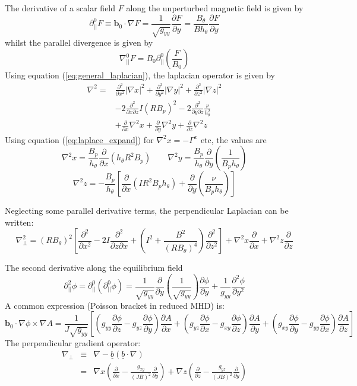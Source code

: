 \documentclass[12pt]{article}
\newcommand{\deriv}[2]{\ensuremath{\frac{\partial #1}{\partial #2}}}
\newcommand{\dderiv}[2]{\ensuremath{\frac{\partial^2 #1}{\partial {#2}^2}}}
\newcommand{\hthe}{\ensuremath{h_\theta}}
\newcommand{\Bp}{\ensuremath{B_\theta}}
\newcommand{\Vec}[1]{\ensuremath{\mathbf{#1}}}
\newcommand{\delp}{\nabla_\perp^2}
\newcommand{\rbp}{\ensuremath{R\Bp}}
\newcommand{\rbpsq}{\ensuremath{\left(\rbp\right)^2}}
\begin{document}
The derivative of a scalar field $F$ along the unperturbed magnetic
field is given by
\[
\partial^0_{||}F \equiv \Vec{b}_0 \cdot\nabla F = \frac{1}{\sqrt{g_{yy}}}\deriv{F}{y} = \frac{\Bp}{B\hthe}\deriv{F}{y}
\]
whilst the parallel divergence is given by
\[
\nabla^0_{||}F = B_0\partial^0_{||}\left(\frac{F}{B_0}\right)
\]
Using equation (\ref{eq:general_laplacian}), the laplacian operator is given by
\begin{eqnarray}
\nabla^2 = &\frac{\partial^2}{\partial x^2}\left|\nabla x\right|^2 + 
\frac{\partial^2}{\partial y^2}\left|\nabla y\right|^2 + 
\frac{\partial^2}{\partial z^2}\left|\nabla z\right|^2 \nonumber \\
&-2\frac{\partial^2}{\partial x\partial z}I\left(RB_p\right)^2 - 2\frac{\partial^2}{\partial y\partial z}\frac{\nu}{h_\theta^2}\\
&+\frac{\partial}{\partial x}\nabla^2x + \frac{\partial}{\partial y}\nabla^2y + \frac{\partial}{\partial z}\nabla^2z \nonumber
\end{eqnarray}
Using equation (\ref{eq:laplace_expand}) for $\nabla^2x = -\Gamma^x$ etc, the values are
\begin{equation}
\nabla^2x = \frac{B_p}{h_\theta}\frac{\partial}{\partial x}\left(h_\theta R^2B_p\right) \qquad
\nabla^2y = \frac{B_p}{h_\theta}\frac{\partial}{\partial y}\left(\frac{1}{B_ph_\theta}\right)
\end{equation}
\[
\nabla^2z = -\frac{B_p}{h_\theta}\left[\frac{\partial}{\partial x}\left(IR^2B_ph_\theta\right) + \frac{\partial}{\partial y}\left(\frac{\nu}{B_ph_\theta}\right)\right]
\]

Neglecting some parallel derivative terms, the perpendicular Laplacian can be written:
\[
\delp = \rbpsq\left[\dderiv{}{x} - 2I\frac{\partial^2}{\partial z\partial x} + \left(I^2 + \frac{B^2}{\left(\rbp\right)^4}\right)\dderiv{}{z}\right] + \nabla^2 x \deriv{}{x} + \nabla^2 z\deriv{}{z} 
\]

The second derivative along the equilibrium field
\[
\partial^2_{||}\phi = \partial^0_{||}\left(\partial^0_{||}\phi\right) = \frac{1}{\sqrt{g_{yy}}}\deriv{}{y}\left(\frac{1}{\sqrt{g_{yy}}}\right)\deriv{\phi}{y} + \frac{1}{g_{yy}}\frac{\partial^2\phi}{\partial y^2}
\]
A common expression (Poisson bracket in reduced MHD) is:
\[
\mathbf{b}_0\cdot\nabla\phi\times\nabla A = \frac{1}{J\sqrt{g_{yy}}}\left[\left(g_{yy}\deriv{\phi}{z} - g_{yz}\deriv{\phi}{y}\right)\deriv{A}{x} + \left(g_{yz}\deriv{\phi}{x} - g_{xy}\deriv{\phi}{z}\right)\deriv{A}{y} + \left(g_{xy}\deriv{\phi}{y} - g_{yy}\deriv{\phi}{x}\right)\deriv{A}{z}\right]
\]
The perpendicular gradient operator:
\begin{eqnarray*}
\nabla_\perp &\equiv& \nabla - \underline{b}\left(\underline{b}\cdot\nabla\right) \\
 &=& \nabla x\left(\deriv{}{x} - \frac{g_{xy}}{\left(JB\right)^2}\deriv{}{y}\right) + \nabla z\left(\deriv{}{z} - \frac{g_{yz}}{\left(JB\right)^2}\deriv{}{y}\right)
\end{eqnarray*}
\end{document}
